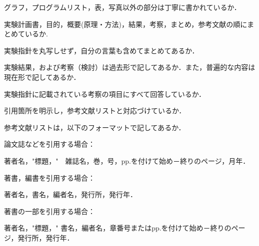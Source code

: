 \documentclass[lualatex,ja=standard]{bxjsarticle}
\begin{document}
\begin{titlepage}
  \fontsize{10.5pt}{13.5pt}\selectfont
  \begin{description}
    \setlength{\parskip}{0.1cm}
    \setlength{\itemsep}{0.1cm}
    \item[\hspace{0.7cm}\checkmark]  グラフ，プログラムリスト，表，写真以外の部分は丁寧に書かれているか．
    \item[\hspace{0.7cm}\checkmark]  実験計画書，目的，概要(原理・方法)，結果，考察，まとめ，参考文献の順にまとめているか.
    \item[\hspace{0.7cm}\checkmark]  実験指針を丸写しせず，自分の言葉も含めてまとめてあるか．
    \item[\hspace{0.7cm}\checkmark]  実験結果，および考察（検討）は過去形で記してあるか．また，普遍的な内容は現在形で記してあるか．
    \item[\hspace{0.7cm}\checkmark]  実験指針に記載されている考察の項目にすべて回答しているか．
    \item[\hspace{0.7cm}\checkmark]  引用箇所を明示し，参考文献リストと対応づけているか．
    \item[\hspace{0.7cm}\checkmark]  参考文献リストは，以下のフォーマットで記してあるか．
      \begin{description}
        \setlength{\parskip}{0.05cm}
        \setlength{\itemsep}{0.05cm}
        \fontsize{10pt}{14pt}\selectfont
        \item[\hspace{0.4cm}○] 論文誌などを引用する場合：

        \fontsize{9pt}{12pt}\selectfont
        [1] 著者名，"標題，"　雑誌名，巻，号，pp.を付けて始め－終りのページ，月年．

        \fontsize{10pt}{14pt}\selectfont
        \item[\hspace{0.4cm}○] 著書，編書を引用する場合：
        
        \fontsize{9pt}{12pt}\selectfont
        [2] 著者名，書名，編者名，発行所，発行年．

        \fontsize{10pt}{14pt}\selectfont
        \item[\hspace{0.4cm}○] 著書の一部を引用する場合：　
        
        \fontsize{9pt}{12pt}\selectfont
        [3] 著者名，"標題，" 書名，編者名，章番号またはpp.を付けて始め－終りのページ，発行所，発行年．
      \end{description}
  \end{description}


\end{titlepage}
\end{document}
